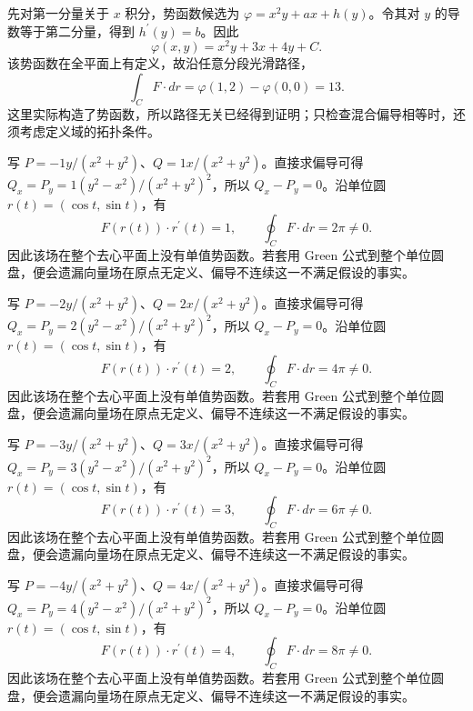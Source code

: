 \documentclass[UTF8,12pt,a4paper,fontset=fandol]{ctexart}
\begin{document}
\begin{solve}\label{ans:c41q19}
先对第一分量关于 $x$ 积分，势函数候选为 $\varphi=x^2y+ax+h(y)$。令其对 $y$ 的导数等于第二分量，得到 $h^{\prime}(y)=b$。因此
\[
\varphi(x,y)=x^2y+3x+4y+C.
\]
该势函数在全平面上有定义，故沿任意分段光滑路径，
\[
\int_C F\cdot dr=\varphi(1,2)-\varphi(0,0)=13.
\]
这里实际构造了势函数，所以路径无关已经得到证明；只检查混合偏导相等时，还须考虑定义域的拓扑条件。
\end{solve}

\begin{solve}\label{ans:c41q20}
写 $P=-1y/(x^2+y^2)$、$Q=1x/(x^2+y^2)$。直接求偏导可得 $Q_x=P_y=1(y^2-x^2)/(x^2+y^2)^2$，所以 $Q_x-P_y=0$。沿单位圆 $r(t)=(\cos t,\sin t)$，有
\[
F(r(t))\cdot r^{\prime}(t)=1,\qquad\oint_C F\cdot dr=2\pi\ne0.
\]
因此该场在整个去心平面上没有单值势函数。若套用 Green 公式到整个单位圆盘，便会遗漏向量场在原点无定义、偏导不连续这一不满足假设的事实。
\end{solve}

\begin{solve}\label{ans:c41q21}
写 $P=-2y/(x^2+y^2)$、$Q=2x/(x^2+y^2)$。直接求偏导可得 $Q_x=P_y=2(y^2-x^2)/(x^2+y^2)^2$，所以 $Q_x-P_y=0$。沿单位圆 $r(t)=(\cos t,\sin t)$，有
\[
F(r(t))\cdot r^{\prime}(t)=2,\qquad\oint_C F\cdot dr=4\pi\ne0.
\]
因此该场在整个去心平面上没有单值势函数。若套用 Green 公式到整个单位圆盘，便会遗漏向量场在原点无定义、偏导不连续这一不满足假设的事实。
\end{solve}

\begin{solve}\label{ans:c41q22}
写 $P=-3y/(x^2+y^2)$、$Q=3x/(x^2+y^2)$。直接求偏导可得 $Q_x=P_y=3(y^2-x^2)/(x^2+y^2)^2$，所以 $Q_x-P_y=0$。沿单位圆 $r(t)=(\cos t,\sin t)$，有
\[
F(r(t))\cdot r^{\prime}(t)=3,\qquad\oint_C F\cdot dr=6\pi\ne0.
\]
因此该场在整个去心平面上没有单值势函数。若套用 Green 公式到整个单位圆盘，便会遗漏向量场在原点无定义、偏导不连续这一不满足假设的事实。
\end{solve}

\begin{solve}\label{ans:c41q23}
写 $P=-4y/(x^2+y^2)$、$Q=4x/(x^2+y^2)$。直接求偏导可得 $Q_x=P_y=4(y^2-x^2)/(x^2+y^2)^2$，所以 $Q_x-P_y=0$。沿单位圆 $r(t)=(\cos t,\sin t)$，有
\[
F(r(t))\cdot r^{\prime}(t)=4,\qquad\oint_C F\cdot dr=8\pi\ne0.
\]
因此该场在整个去心平面上没有单值势函数。若套用 Green 公式到整个单位圆盘，便会遗漏向量场在原点无定义、偏导不连续这一不满足假设的事实。
\end{solve}
\end{document}
